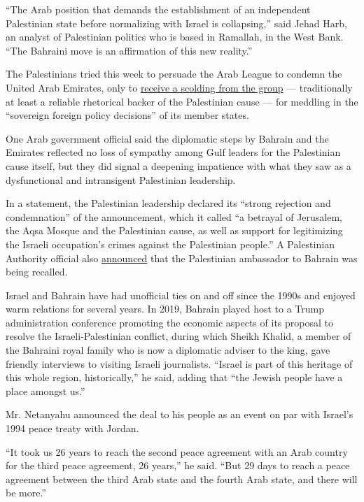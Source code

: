 ``The Arab position that demands the establishment of an independent
Palestinian state before normalizing with Israel is collapsing,'' said
Jehad Harb, an analyst of Palestinian politics who is based in Ramallah,
in the West Bank. ``The Bahraini move is an affirmation of this new
reality.''

The Palestinians tried this week to persuade the Arab League to condemn
the United Arab Emirates, only to
\href{https://www.timesofisrael.com/in-blow-to-palestinians-arab-league-refuses-to-condemn-israel-uae-deal/\#gs.fvfqe9}{receive
a scolding from the group} --- traditionally at least a reliable
rhetorical backer of the Palestinian cause --- for meddling in the
``sovereign foreign policy decisions'' of its member states.

One Arab government official said the diplomatic steps by Bahrain and
the Emirates reflected no loss of sympathy among Gulf leaders for the
Palestinian cause itself, but they did signal a deepening impatience
with what they saw as a dysfunctional and intransigent Palestinian
leadership.

In a statement, the Palestinian leadership declared its ``strong
rejection and condemnation'' of the announcement, which it called ``a
betrayal of Jerusalem, the Aqsa Mosque and the Palestinian cause, as
well as support for legitimizing the Israeli occupation's crimes against
the Palestinian people.'' A Palestinian Authority official also
\href{https://www.facebookcorewwwi.onion/mofa.pna/posts/3502604999782610}{announced}
that the Palestinian ambassador to Bahrain was being recalled.

Israel and Bahrain have had unofficial ties on and off since the 1990s
and enjoyed warm relations for several years. In 2019, Bahrain played
host to a Trump administration conference promoting the economic aspects
of its proposal to resolve the Israeli-Palestinian conflict, during
which Sheikh Khalid, a member of the Bahraini royal family who is now a
diplomatic adviser to the king, gave friendly interviews to visiting
Israeli journalists. ``Israel is part of this heritage of this whole
region, historically,'' he said, adding that ``the Jewish people have a
place amongst us.''

Mr. Netanyahu announced the deal to his people as an event on par with
Israel's 1994 peace treaty with Jordan.

``It took us 26 years to reach the second peace agreement with an Arab
country for the third peace agreement, 26 years,'' he said. ``But 29
days to reach a peace agreement between the third Arab state and the
fourth Arab state, and there will be more.''


